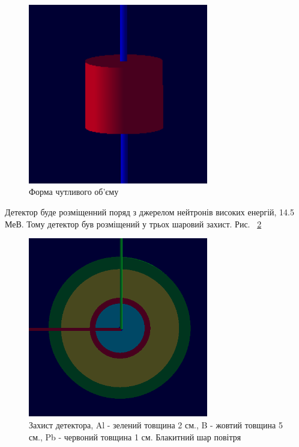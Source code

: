 \documentclass[a4paper, 14pt]{article}
\numberwithin{equation}{section}
\numberwithin{table}{section}
\begin{document}
	\begin{figure}[hbt!]
		\centering \includegraphics[width=0.7\textwidth]{images/sDetector158cm3.png}
		\caption{Форма чутливого об'єму} 
		\label{ris:s_detector_volume}	
	\end{figure} 

	Детектор буде розміщенний поряд з джерелом нейтронів високих енергій, 14.5 МеВ. Тому детектор був розміщений у трьох шаровий захист. Рис. ~\ref{ris:s_detector_P}
	
	\begin{figure}[hbt!]
		\centering \includegraphics[width=0.7\textwidth]{images/dectorPrt.png}
		\caption{Захист детектора, Al - зелений товщина 2 см., B - жовтий товщина 5 см., Pb - червоний товщина 1 см. Блакитний шар повітря} 
		\label{ris:s_detector_P}	
	\end{figure} 
\end{document}
